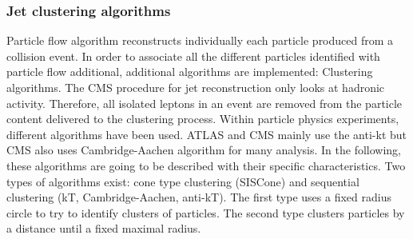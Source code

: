 \subsubsection{Jet clustering algorithms}

Particle flow algorithm reconstructs individually each particle produced from a collision event. In order to associate all the different particles identified with particle flow additional, additional algorithms are implemented: Clustering algorithms. The CMS procedure for jet reconstruction only looks at hadronic activity. Therefore, all isolated leptons in an event are removed from the particle content delivered to the clustering process. Within particle physics experiments, different algorithms have been used. ATLAS and CMS mainly use the anti-kt but CMS also uses Cambridge-Aachen algorithm for many analysis. In the following, these algorithms are going to be described with their specific characteristics. Two types of algorithms exist: cone type clustering (SISCone) and sequential clustering (kT, Cambridge-Aachen, anti-kT). The first type uses a fixed radius circle to try to identify clusters of particles. The second type clusters particles by a distance until a fixed maximal radius. 


